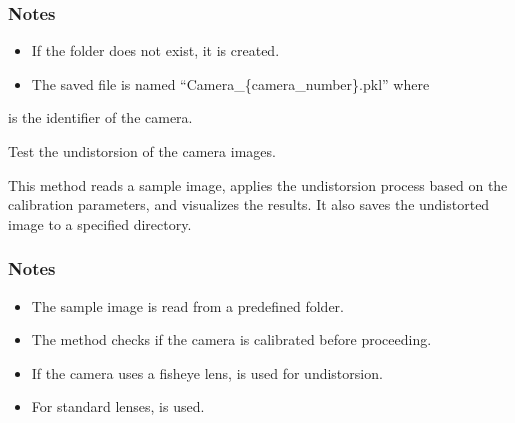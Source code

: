 \documentclass[letterpaper,10pt,english]{sphinxmanual}
\begin{document}
\begin{fulllineitems}
\begin{fulllineitems}
\begin{quote}
\begin{description}
\end{description}\end{quote}
\subsubsection*{Notes}
\begin{itemize}
\item {} 
\sphinxAtStartPar
If the folder does not exist, it is created.

\item {} 
\sphinxAtStartPar
The saved file is named “Camera\_\{camera\_number\}.pkl” where

\end{itemize}

\sphinxAtStartPar
{} is the identifier of the camera.

\end{fulllineitems}


\begin{fulllineitems}
\label{\detokenize{CameraUtils:id24}}
\pysigstartsignatures
{}
\pysigstopsignatures
\sphinxAtStartPar
Test the undistorsion of the camera images.

\sphinxAtStartPar
This method reads a sample image, applies the undistorsion process based on
the calibration parameters, and visualizes the results. It also saves the
undistorted image to a specified directory.
\subsubsection*{Notes}
\begin{itemize}
\item {} 
\sphinxAtStartPar
The sample image is read from a predefined folder.

\item {} 
\sphinxAtStartPar
The method checks if the camera is calibrated before proceeding.

\item {} 
\sphinxAtStartPar
If the camera uses a fisheye lens,  is used for undistorsion.

\item {} 
\sphinxAtStartPar
For standard lenses,  is used.


\end{itemize}
\end{fulllineitems}
\end{fulllineitems}
\end{document}
